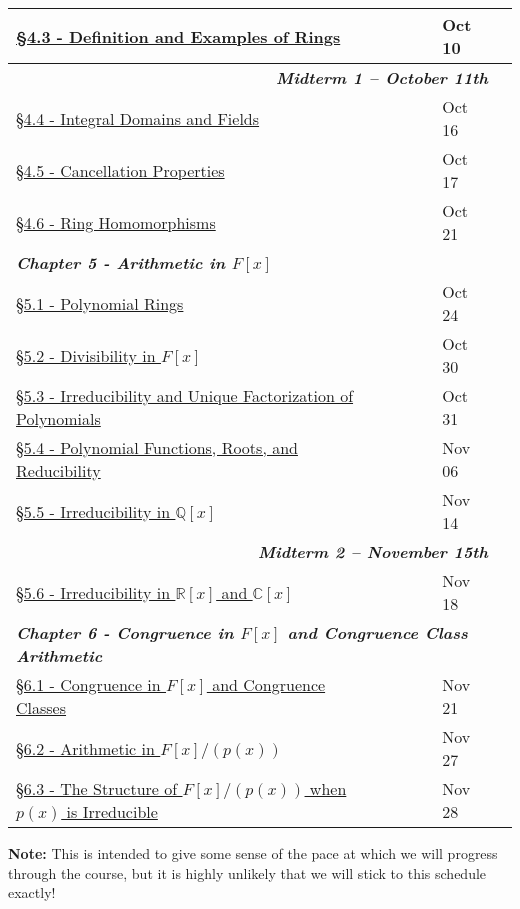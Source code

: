 \documentclass{article}
\newcommand{\chaptercolor}{RoyalBlue!35}
\newcommand{\testcolor}{Bittersweet!25}
\begin{document}
\begin{center}
\begin{tabular}{|l|l|l|l|l|l|}
\href{}{\S4.3 - Definition and Examples of Rings} & & & & Oct 10\\
\hline
\multicolumn{5}{|r|}{\cellcolor{\testcolor} \textit{\textbf{Midterm 1 -- October 11th}}}\\
\hline
\href{}{\S4.4 - Integral Domains and Fields} & & & & Oct 16\\
\href{}{\S4.5 - Cancellation Properties} & & & & Oct 17\\
\href{}{\S4.6 - Ring Homomorphisms} & & & & Oct 21\\
\hline
\multicolumn{5}{|l|}{\cellcolor{\chaptercolor} \textit{\textbf{Chapter 5 - Arithmetic in $F[x]$}}}\\
\hline
\href{}{\S5.1 - Polynomial Rings} & & & & Oct 24\\
\href{}{\S5.2 - Divisibility in $F[x]$} & & & & Oct 30\\
\href{}{\S5.3 - Irreducibility and Unique Factorization of Polynomials} & & & & Oct 31\\
\href{}{\S5.4 - Polynomial Functions, Roots, and Reducibility} & & & & Nov 06\\
\href{}{\S5.5 - Irreducibility in $\mathbb{Q}[x]$} & & & & Nov 14\\
\hline
\multicolumn{5}{|r|}{\cellcolor{\testcolor} \textit{\textbf{Midterm 2 -- November 15th}}}\\
\hline
\href{}{\S5.6 - Irreducibility in $\mathbb{R}[x]$ and $\mathbb{C}[x]$} & & & & Nov 18\\
\hline
\multicolumn{5}{|l|}{\cellcolor{\chaptercolor} \textit{\textbf{Chapter 6 - Congruence in $F[x]$ and Congruence Class Arithmetic}}}\\
\hline
\href{}{\S6.1 - Congruence in $F[x]$ and Congruence Classes} & & & & Nov 21\\
\href{}{\S6.2 - Arithmetic in $F[x]/(p(x))$} & & & & Nov 27\\
\href{}{\S6.3 - The Structure of $F[x]/(p(x))$ when $p(x)$ is Irreducible} & & & & Nov 28\\
\hline
\end{tabular}
\end{center}
\noindent \textbf{Note:} This is intended to give some sense of the pace at which we will progress through the course, but it is highly unlikely that we will stick to this schedule exactly!
\end{document}

